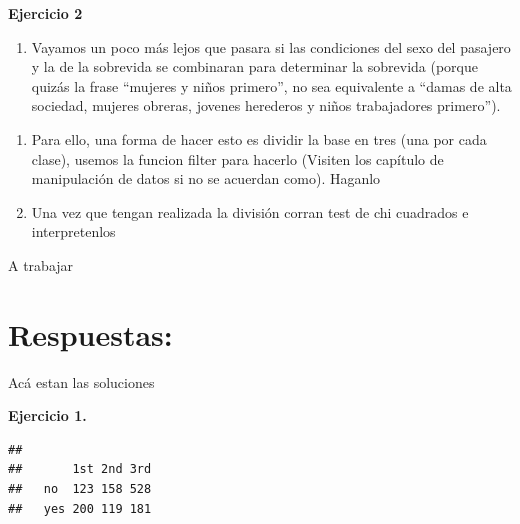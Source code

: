 \documentclass[
]{book}
\newenvironment{Shaded}{\begin{snugshade}}{\end{snugshade}}
\newcommand{\CommentTok}[1]{\textcolor[rgb]{0.56,0.35,0.01}{\textit{#1}}}
\newcommand{\FunctionTok}[1]{\textcolor[rgb]{0.00,0.00,0.00}{#1}}
\newcommand{\NormalTok}[1]{#1}
\newcommand{\SpecialCharTok}[1]{\textcolor[rgb]{0.00,0.00,0.00}{#1}}
\providecommand{\tightlist}{%
  \setlength{\itemsep}{0pt}\setlength{\parskip}{0pt}}
\begin{document}
\textbf{Ejercicio 2}

\begin{enumerate}
\def\labelenumi{\arabic{enumi}.}
\setcounter{enumi}{1}
\tightlist
\item
  Vayamos un poco más lejos que pasara si las condiciones del sexo del pasajero y la de la sobrevida se combinaran para determinar la sobrevida (porque quizás la frase ``mujeres y niños primero'', no sea equivalente a ``damas de alta sociedad, mujeres obreras, jovenes herederos y niños trabajadores primero'').
\end{enumerate}

\begin{enumerate}
\def\labelenumi{\alph{enumi}.}
\item
  Para ello, una forma de hacer esto es dividir la base en tres (una por cada clase), usemos la funcion filter para hacerlo (Visiten los capítulo de manipulación de datos si no se acuerdan como). Haganlo
\item
  Una vez que tengan realizada la división corran test de chi cuadrados e interpretenlos
\end{enumerate}

A trabajar

\hypertarget{respuestas-3}{%
\section{\texorpdfstring{ Respuestas:}{ Respuestas:}}\label{respuestas-3}}

Acá estan las soluciones

\textbf{Ejercicio 1. }

\begin{Shaded}
\end{Shaded}

\begin{verbatim}
##      
##       1st 2nd 3rd
##   no  123 158 528
##   yes 200 119 181
\end{verbatim}

\begin{Shaded}
\end{Shaded}
\end{document}
